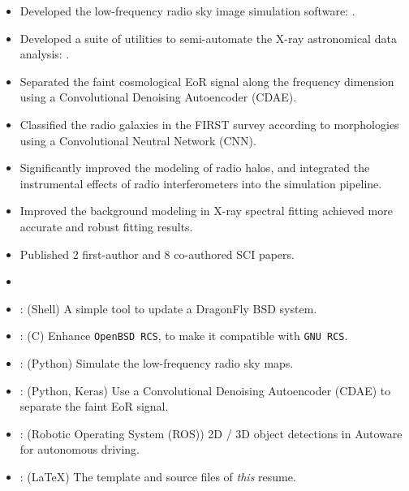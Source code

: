 \documentclass{resume}
\begin{document}
\begin{itemize}
  \item Developed the low-frequency radio sky image simulation software:
    .
  \item Developed a suite of utilities to semi-automate the
    X-ray astronomical data analysis:
    .
  \item Separated the faint cosmological EoR signal along the frequency
    dimension using a Convolutional Denoising Autoencoder (CDAE).
  \item Classified the radio galaxies in the FIRST survey according to
    morphologies using a Convolutional Neutral Network (CNN).
  \item Significantly improved the modeling of radio halos,
    and integrated the instrumental effects of radio interferometers
    into the simulation pipeline.
  \item Improved the background modeling in X-ray spectral fitting
    achieved more accurate and robust fitting results.
  \item Published 2 first-author and 8 co-authored SCI papers.
\end{itemize}

\begin{itemize}
  \item 
  \item {}:
    (Shell)
    A simple tool to update a DragonFly BSD system.
  \item {}:
    (C)
    Enhance \texttt{OpenBSD RCS}, to make it compatible with \texttt{GNU RCS}.
  \item {}:
    (Python)
    Simulate the low-frequency radio sky maps.
  \item {}:
    (Python, Keras)
    Use a Convolutional Denoising Autoencoder (CDAE) to separate the
    faint EoR signal.
  \item {}:
    (Robotic Operating System (ROS))
    2D / 3D object detections in Autoware for autonomous driving.
  \item {}:
    (\LaTeX)
    The template and source files of \emph{this} resume.
\end{itemize}
\end{document}
